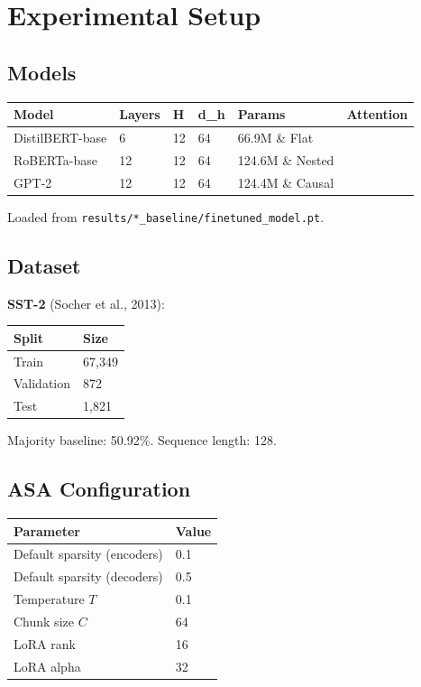 
\section{Experimental Setup}

\subsection{Models}

\begin{table}[H]
\centering
\small
\begin{tabular}{llllll}
\toprule
\textbf{Model} & \textbf{Layers} & \textbf{H} & \textbf{d\_h} & \textbf{Params} & \textbf{Attention} \\
\midrule
DistilBERT-base & 6 & 12 & 64 & 66.9M \& Flat \\
RoBERTa-base & 12 & 12 & 64 & 124.6M \& Nested \\
GPT-2 & 12 & 12 & 64 & 124.4M \& Causal \\
\bottomrule
\end{tabular}
\end{table}

Loaded from \texttt{results/*\_baseline/finetuned\_model.pt}.

\subsection{Dataset}

\textbf{SST-2} (Socher et al., 2013):

\begin{table}[H]
\centering
\small
\begin{tabular}{ll}
\toprule
\textbf{Split} & \textbf{Size} \\
\midrule
Train & 67,349 \\
Validation & 872 \\
Test & 1,821 \\
\bottomrule
\end{tabular}
\end{table}

Majority baseline: 50.92\%. Sequence length: 128.

\subsection{ASA Configuration}

\begin{table}[H]
\centering
\small
\begin{tabular}{ll}
\toprule
\textbf{Parameter} & \textbf{Value} \\
\midrule
Default sparsity (encoders) & 0.1 \\
Default sparsity (decoders) & 0.5 \\
Temperature $T$ & 0.1 \\
Chunk size $C$ & 64 \\
LoRA rank & 16 \\
LoRA alpha & 32 \\
\bottomrule
\end{tabular}
\end{table}

